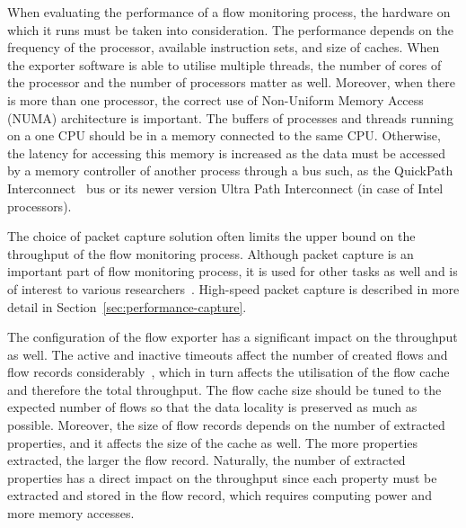 When evaluating the performance of a flow monitoring process, the hardware on which it runs must be taken into consideration. The performance depends on the frequency of the processor, available instruction sets, and size of caches. When the exporter software is able to utilise multiple threads, the number of cores of the processor and the number of processors matter as well. Moreover, when there is more than one processor, the correct use of Non-Uniform Memory Access (NUMA) architecture is important. The buffers of processes and threads running on a one CPU should be in a memory connected to the same CPU. Otherwise, the latency for accessing this memory is increased as the data must be accessed by a memory controller of another process through a bus such, as the QuickPath Interconnect~\cite{IntelCorporation-2009-Introduction} bus or its newer version Ultra Path Interconnect (in case of Intel processors).

The choice of packet capture solution often limits the upper bound on the throughput of the flow monitoring process. Although packet capture is an important part of flow monitoring process, it is used for other tasks as well and is of interest to various researchers~\cite{Garcia-Dorado-2013-High, Nassopulos-2014-Flow}. High-speed packet capture is described in more detail in Section~\ref{sec:performance-capture}.

The configuration of the flow exporter has a significant impact on the throughput as well. The active and inactive timeouts affect the number of created flows and flow records considerably~\cite{Hofstede-2014-Flow}, which in turn affects the utilisation of the flow cache and therefore the total throughput. The flow cache size should be tuned to the expected number of flows so that the data locality is preserved as much as possible. Moreover, the size of flow records depends on the number of extracted properties, and it affects the size of the cache as well. The more properties extracted, the larger the flow record. Naturally, the number of extracted properties has a direct impact on the throughput since each property must be extracted and stored in the flow record, which requires computing power and more memory accesses.

